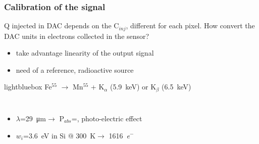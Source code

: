     \begin{frame}
        \frametitle{Calibration of the signal}
        Q injected in DAC depends on the C$_{inj}$, different for each pixel.     
        \bigskip
        How convert the DAC units in electrons collected in the sensor?\\
        \begin{itemize}
            \item take advantage linearity of the output signal 
            \item need of a reference, radioactive source
        \end{itemize}
        \bigskip
        \begin{beamercolorbox}[sep=0em,wd=0.85\textwidth,ht=1.5ex, dp=0.1ex, rounded=true, center]{lightbluebox}
            Fe$^{55}$ $\rightarrow$ Mn$^{55}$ + K$_\alpha$ (\SI{5.9}{keV}) or K$_\beta$ (\SI{6.5}{keV})
        \end{beamercolorbox}
        \begin{columns}
            \begin{itemize}
                \item $\lambda$=\SI{29}{\um}$\rightarrow$ P$_{abs}$=, photo-electric effect
                \item $w_i$=\SI{3.6}{eV} in Si @ \SI{300}{\kelvin}$\rightarrow$ \SI{1616}{\elementarycharge}$^-$
            \end{itemize}
        \end{columns}
    \end{frame}  


